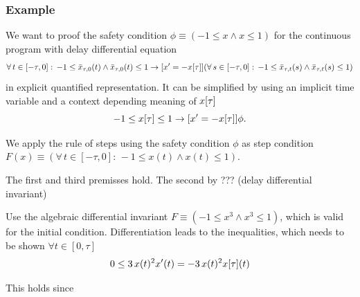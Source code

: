 \documentclass[10pt]{article}
\begin{document}
        \subsubsection{Example}
            \label{sec:example}
            We want to proof the safety condition $\phi\equiv(-1\leq x\wedge x\leq 1)$ for the continuous program with delay differential equation
            \begin{equation}
                \forall\,t\in[-\tau,0]:\,-1\leq\bar{x}_{\tau,0}(t)\wedge\bar{x}_{\tau,0}(t)\leq 1
                \rightarrow
                [x'=-x[\tau]] (\forall\,s\in[-\tau,0]:\,-1\leq\bar{x}_{\tau,t}(s)\wedge\bar{x}_{\tau,t}(s)\leq 1)
            \end{equation}
            in explicit quantified representation. It can be simplified by using an implicit time variable and a context depending meaning of $x[\tau]$
            \begin{equation}
                -1\leq x[\tau]\leq 1 \rightarrow [x'=-x[\tau]]\phi.
            \end{equation}

            We apply the rule of steps using the safety condition $\phi$ as step condition $F(x)\equiv(\forall\,t\in[-\tau,0]:\,-1\leq x(t)\wedge x(t)\leq 1)$.

            The first and third premisses hold. The second by ??? (delay differential invariant)

            Use the algebraic differential invariant $F\equiv(-1\leq x^3\wedge x^3\leq1)$, which is valid for the initial condition. Differentiation leads to the inequalities, which needs to be shown $\forall t\in[0,\tau]$
            \begin{equation}
                0\leq 3\,x(t)^2 x'(t) = -3\,x(t)^2 x[\tau](t)
            \end{equation}

            This holds since










\nocite{*}


\end{document}
